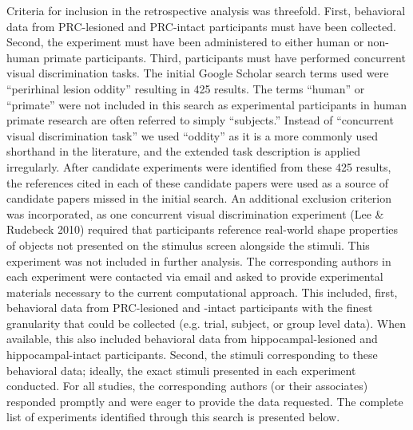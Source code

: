 \documentclass[11pt]{article}
\begin{document}
Criteria for inclusion in the retrospective analysis was threefold. First, behavioral data from PRC-lesioned and PRC-intact participants must have been collected. Second, the experiment must have been administered to either human or non-human primate participants. Third, participants must have performed concurrent visual discrimination tasks. The initial Google Scholar search terms used were “perirhinal lesion oddity” resulting in 425 results. The terms “human” or “primate” were not included in this search as experimental participants in human primate research are often referred to simply “subjects.” Instead of “concurrent visual discrimination task” we used “oddity” as it is a more commonly used shorthand in the literature, and the extended task description is applied irregularly. After candidate experiments were identified from these 425 results, the references cited in each of these candidate papers were used as a source of candidate papers missed in the initial search. An additional exclusion criterion was incorporated, as one concurrent visual discrimination experiment (Lee \& Rudebeck 2010) required that participants reference real-world shape properties of objects not presented on the stimulus screen alongside the stimuli. This experiment was not included in further analysis. The corresponding authors in each experiment were contacted via email and asked to provide experimental materials necessary to the current computational approach. This included, first, behavioral data from PRC-lesioned and -intact participants with the finest granularity that  could be collected (e.g. trial, subject, or group level data). When available, this also included behavioral data from hippocampal-lesioned and hippocampal-intact participants. Second, the stimuli corresponding to these behavioral data; ideally, the exact stimuli presented in each experiment conducted. For all studies, the corresponding authors (or their associates) responded promptly and were eager to provide the data requested. The complete list of experiments identified through this search is presented below. 
\end{document}
